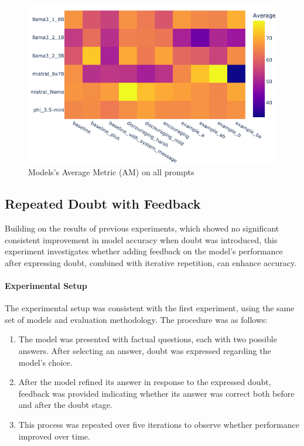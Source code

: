 \begin{figure}[ht!]
  \includegraphics[width=\columnwidth]{img/model_performence_on_prompts.png}
  \caption{Models's Average Metric (AM) on all prompts}
  \label{rep: Models average heatmap}
\end{figure}

\subsection{Repeated Doubt with Feedback}

Building on the results of previous experiments, which showed no significant consistent improvement in model accuracy when doubt was introduced, this experiment investigates whether adding feedback on the model's performance after expressing doubt, combined with iterative repetition, can enhance accuracy.

\paragraph{Experimental Setup}
The experimental setup was consistent with the first experiment, using the same set of models and evaluation methodology. The procedure was as follows:

\begin{enumerate}
  \item The model was presented with factual questions, each with two possible answers. After selecting an answer, doubt was expressed regarding the model's choice.
  \item After the model refined its answer in response to the expressed doubt, feedback was provided indicating whether its answer was correct both before and after the doubt stage.
  \item This process was repeated over five iterations to observe whether performance improved over time.
\end{enumerate}

